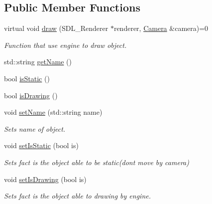 \subsection*{Public Member Functions}
\begin{DoxyCompactItemize}
\item 
virtual void \hyperlink{class_virtual_1_1_drawable_af7014800911efa59b96e538149e56f8b}{draw} (S\+D\+L\+\_\+\+Renderer $\ast$renderer, \hyperlink{class_virtual_1_1_camera}{Camera} \&camera)=0
\begin{DoxyCompactList}\small\item\em Function that use engine to draw object. \end{DoxyCompactList}\item 
std\+::string \hyperlink{class_virtual_1_1_drawable_a6b00363f9db9c6b0e1bf09e250f687cb}{get\+Name} ()
\item 
bool \hyperlink{class_virtual_1_1_drawable_a7901d5ac8f7ebed5e3d5773c9699ca7c}{is\+Static} ()
\item 
bool \hyperlink{class_virtual_1_1_drawable_a47902855528332fd79595db7dacca2ed}{is\+Drawing} ()
\item 
void \hyperlink{class_virtual_1_1_drawable_aef40e51fef6aacd0bc200347671126f0}{set\+Name} (std\+::string name)
\begin{DoxyCompactList}\small\item\em Sets name of object. \end{DoxyCompactList}\item 
void \hyperlink{class_virtual_1_1_drawable_a94ed4174ab71aa5aea957d821bc8d170}{set\+Is\+Static} (bool is)
\begin{DoxyCompactList}\small\item\em Sets fact is the object able to be static(don\textquotesingle{}t move by camera) \end{DoxyCompactList}\item 
void \hyperlink{class_virtual_1_1_drawable_af47ef44ac82ef8f11873fcf3e7a4aaa0}{set\+Is\+Drawing} (bool is)
\begin{DoxyCompactList}\small\item\em Sets fact is the object able to drawing by engine. \end{DoxyCompactList}\end{DoxyCompactItemize}
